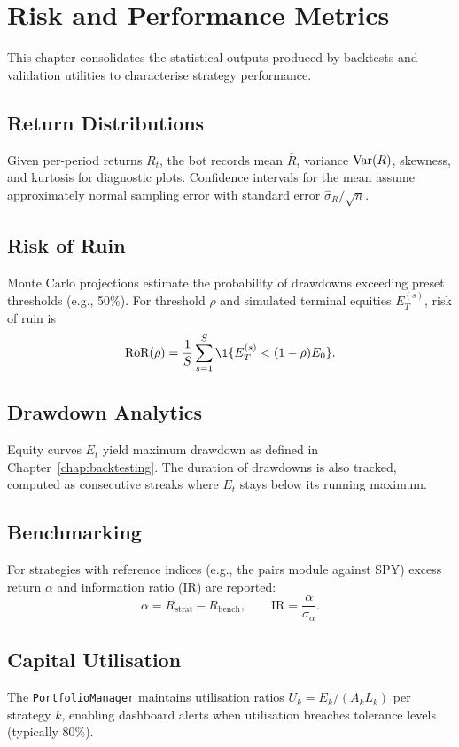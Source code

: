 \chapter{Risk and Performance Metrics}

This chapter consolidates the statistical outputs produced by backtests and validation utilities to characterise strategy performance.

\section{Return Distributions}
Given per-period returns $R_t$, the bot records mean $\bar{R}$, variance $\operatorname{Var}(R)$, skewness, and kurtosis for diagnostic plots. Confidence intervals for the mean assume approximately normal sampling error with standard error $\hat{\sigma}_R / \sqrt{n}$.

\section{Risk of Ruin}
Monte Carlo projections estimate the probability of drawdowns exceeding preset thresholds (e.g., 50\%). For threshold $\rho$ and simulated terminal equities $E_T^{(s)}$, risk of ruin is
\begin{equation}
\text{RoR}(\rho) = \frac{1}{S} \sum_{s=1}^{S} \1\{E_T^{(s)} < (1-\rho)E_0\}.
\end{equation}

\section{Drawdown Analytics}
Equity curves $E_t$ yield maximum drawdown as defined in Chapter~\ref{chap:backtesting}. The duration of drawdowns is also tracked, computed as consecutive streaks where $E_t$ stays below its running maximum.

\section{Benchmarking}
For strategies with reference indices (e.g., the pairs module against SPY) excess return $\alpha$ and information ratio (IR) are reported:
\begin{equation}
\alpha = R_{\text{strat}} - R_{\text{bench}}, \qquad \text{IR} = \frac{\alpha}{\sigma_{\alpha}}.
\end{equation}

\section{Capital Utilisation}
The \texttt{PortfolioManager} maintains utilisation ratios $U_k = E_k / (A_k L_k)$ per strategy $k$, enabling dashboard alerts when utilisation breaches tolerance levels (typically 80\%).
